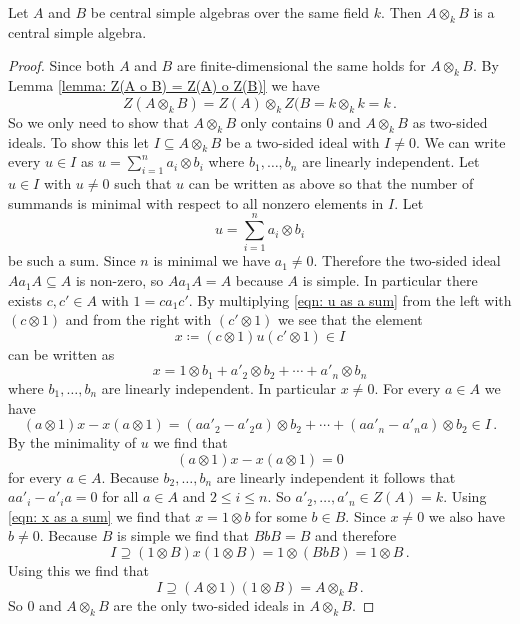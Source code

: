 \begin{proposition}
  Let $A$ and $B$ be central simple algebras over the same field $k$.
  Then $A \otimes_k B$ is a central simple algebra.
\end{proposition}
\begin{proof}
  Since both $A$ and $B$ are finite-dimensional the same holds for $A \otimes_k B$.
  By Lemma \ref{lemma: Z(A o B) = Z(A) o Z(B)} we have
  \[
      Z(A \otimes_k B)
    = Z(A) \otimes_k Z(B
    = k \otimes_k k
    = k \,.
  \]
  So we only need to show that $A \otimes_k B$ only contains $0$ and $A \otimes_k B$ as two-sided ideals.
  To show this let $I \subseteq A \otimes_k B$ be a two-sided ideal with $I \neq 0$.
  We can write every $u \in I$ as $u = \sum_{i=1}^n a_i \otimes b_i$ where $b_1, \dotsc, b_n$ are linearly independent.
  Let $u \in I$ with $u \neq 0$ such that $u$ can be written as above so that the number of summands is minimal with respect to all nonzero elements in $I$.
  Let
  \begin{equation}\label{eqn: u as a sum}
    u = \sum_{i=1}^n a_i \otimes b_i
  \end{equation}
  be such a sum.
  Since $n$ is minimal we have $a_1 \neq 0$.
  Therefore the two-sided ideal $A a_1 A \subseteq A$ is non-zero, so $A a_1 A = A$ because $A$ is simple.
  In particular there exists $c, c' \in A$ with $1 = c a_1 c'$.
  By multiplying \eqref{eqn: u as a sum} from the left with $(c \otimes 1)$ and from the right with $(c' \otimes 1)$ we see that the element
  \[
              x
    \coloneqq (c \otimes 1) u (c' \otimes 1)
    \in       I
  \]
  can be written as
  \begin{equation}\label{eqn: x as a sum}
        x
    =   1 \otimes b_1
      + a'_2 \otimes b_2
      + \dotsb
      + a'_n \otimes b_n
  \end{equation}
  where $b_1, \dotsc, b_n$ are linearly independent.
  In particular $x \neq 0$.
  For every $a \in A$ we have
  \[
        (a \otimes 1) x - x (a \otimes 1)
    =   (a a'_2 - a'_2 a) \otimes b_2
      + \dotsb
      + (a a'_n - a'_n a) \otimes b_2 \in I \,.
  \]
  By the minimality of $u$ we find that
  \[
      (a \otimes 1) x - x (a \otimes 1)
    = 0
  \]
  for every $a \in A$.
  Because $b_2, \dotsc, b_n$ are linearly independent it follows that $a a'_i - a'_i a = 0$ for all $a \in A$ and $2 \leq i \leq n$.
  So $a'_2, \dotsc, a'_n \in Z(A) = k$.
  Using \eqref{eqn: x as a sum} we find that $x = 1 \otimes b$ for some $b \in B$.
  Since $x \neq 0$ we also have $b \neq 0$.
  Because $B$ is simple we find that $BbB = B$ and therefore
  \[
              I
    \supseteq (1 \otimes B) x (1 \otimes B)
    =         1 \otimes (BbB)
    =         1 \otimes B \,.
  \]
  Using this we find that
  \[
              I
    \supseteq (A \otimes 1) (1 \otimes B)
    =         A \otimes_k B \,.
  \]
  So $0$ and $A \otimes_k B$ are the only two-sided ideals in $A \otimes_k B$.
\end{proof}






